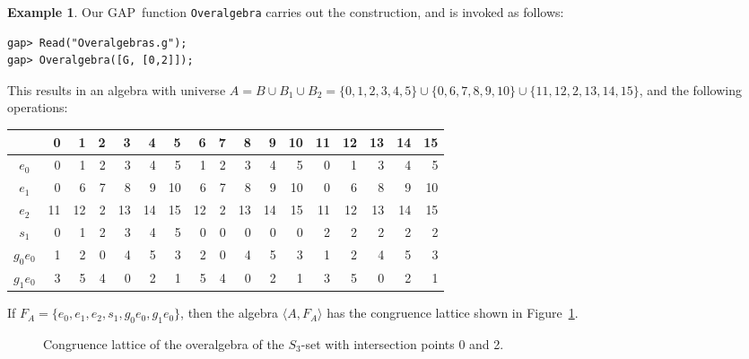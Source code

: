 \documentclass{au}
\numberwithin{equation}{section}
\theoremstyle{plain}
\theoremstyle{definition}
\newtheorem{example}[theorem]{Example}
\newcommand{\<}{\ensuremath{\langle}}
\renewcommand{\>}{\ensuremath{\rangle}}
\newcommand{\GAP}{{\small GAP}} %
\newcommand{\dotsize}{1.0pt}%
\begin{document}
\begin{example}
Our \GAP\ function {\tt Overalgebra} carries out the construction, and is
invoked as follows:

\begin{small}
\begin{verbatim}
gap> Read("Overalgebras.g");
gap> Overalgebra([G, [0,2]]);
\end{verbatim}
\end{small}

\noindent %
This results in an
algebra with universe $A = B \cup B_1 \cup B_2 = \{ 0, 1, 2, 3, 4, 5\} \cup
\{0, 6, 7, 8, 9, 10\} \cup\{ 11, 12, 2, 13, 14, 15\}$,
and the following operations:

\smallskip %
\begin{center}
\begin{tabular}{c|r|r|r|r|r|r|r|r|r|r|r|r|r|r|r|r}
 &0&1&2&3&4&5&6&7&8&9&10&11&12&13&14&15\\
\hline
$e_0$ & 0& 1& 2& 3& 4& 5& 1& 2& 3& 4& 5& 0& 1& 3& 4& 5\\
$e_1$ & 0& 6& 7& 8& 9& 10& 6& 7& 8& 9& 10& 0& 6& 8& 9& 10\\
$e_2$ &11& 12& 2& 13& 14& 15& 12& 2& 13& 14& 15& 11& 12& 13& 14& 15\\
$s_1$  & 0& 1& 2& 3& 4& 5& 0& 0& 0& 0& 0& 2& 2& 2& 2& 2\\
$g_0 e_0$&1 &2 &0 &4 &5 &3 &2 &0 &4 &5 &3 &1 &2 &4 &5 &3\\
$g_1 e_0$& 3 &5 &4 &0 &2 &1 &5 &4 &0 &2 &1 &3 &5 &0 &2 &1
\end{tabular}
\end{center}
\smallskip %
\noindent %
If %
$F_A=\{e_0, e_1, e_2, s_1, g_0 e_0, g_1 e_0\}$, then the
algebra $\<A, F_A\>$ has the congruence lattice shown in Figure~\ref{fig:OverAlgebra-S3-0-2}.
\begin{figure}[h!]
  \centering
  \caption{Congruence lattice of the overalgebra of the $S_3$-set with
    intersection points 0 and 2.}
  \label{fig:OverAlgebra-S3-0-2}
\end{figure}


\end{example}
\end{document}
